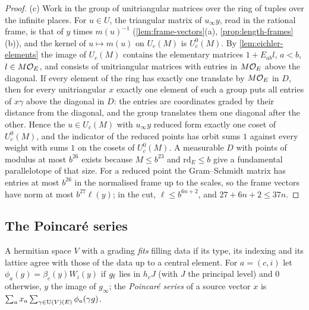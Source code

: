 \begin{proof}
(c) Work in the group of unitriangular matrices over the ring of tuples over the infinite places. For $u\in U$, the triangular matrix of $u_\infty y$, read in the rational frame, is that of $y$ times $m(u)^{-1}$ (\cref{lem:frame-vectors}(a), \cref{prop:length-frames}(b)), and the kernel of
$u\mapsto m(u)$ on $U_c(M)$ is $U^0_c(M)$. By \cref{lem:eichler-elements} the image of $U_c(M)$ contains the elementary matrices $1+E_{ab}l$, $a<b$, $l\in M\mathcal{O}_E$, and consists of unitriangular matrices with entries in $M\mathcal{O}_E$ above the diagonal. If every element of the
ring has exactly one translate by $M\mathcal{O}_E$ in $D$, then for every unitriangular $x$ exactly one element of such a group puts all entries of $x\gamma$ above the diagonal in $D$: the entries are coordinates graded by their distance from the diagonal, and the group
translates them one diagonal after the other. Hence the $u\in U_c(M)$ with $u_\infty y$ reduced form exactly one coset of $U^0_c(M)$, and the indicator of the reduced points has orbit sums $1$ against every weight with sums $1$ on the cosets of $U^0_c(M)$. A measurable
$D$ with points of modulus at most $b^{26}$ exists because $M\le b^{23}$ and $\mathrm{rd}_E\le b$ give a fundamental parallelotope of that size. For a reduced point the Gram--Schmidt matrix has entries at most $b^{26}$ in the normalised frame up to the scales, so the
frame vectors have norm at most $b^{27}\ell(y)$; in the cut, $\ell\le b^{6n+2}$, and $27+6n+2\le37n$.
\end{proof}

\subsection{The Poincar\'e series}\label{ss:poincare-series}
A hermitian space $V$ with a grading \emph{fits} filling data if its type, its indexing and its lattice agree with those of the data up to a central element. For $a=(c,i)$ let
$\phi_a(g)=\beta_c(y)W_i(y)$ if $g_{\rm f}$ lies in $h_cJ$ (with $J$ the principal level) and $0$ otherwise, $y$ the image of $g_\infty$; the \emph{Poincar\'e series} of a source vector $x$ is
$\sum_ax_a\sum_{\gamma\in\operatorname{U}(V)(E)}\phi_a(\gamma g)$.

